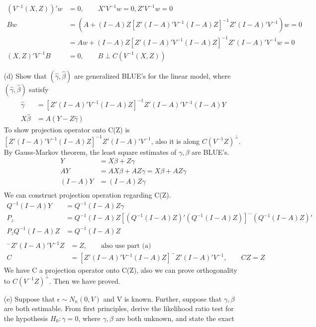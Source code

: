 \begin{itemize}
\begin{align*}
(V^{-1} (X,Z))'w &= 0, \qquad X' V^{-1} w = 0, Z' V^{-1} w = 0\\
Bw &= \left(A + (I-A)Z [Z'(I-A)' V^{-1} (I-A)Z]^{-1} Z'(I-A)'V^{-1} \right) w= 0 \\
&= Aw + (I-A)Z [Z'(I-A)' V^{-1} (I-A)Z]^{-1} Z'(I-A)'V^{-1} w = 0\\
(X,Z)' V^{-1} B &= 0, \qquad B \perp  C(V^{-1} (X,Z))
\end{align*}
\item[(d)] Show that $(\hat{\gamma}, \hat{\beta})$ are generalized BLUE's for the linear model, where $(\hat{\gamma}, \hat{\beta})$ satisfy
\begin{align*}
\hat{\gamma} &= [Z'(I-A)' V^{-1} (I-A)Z]^{-1} Z'(I-A)' V^{-1} (I-A)Y\\
X\hat{\beta} &= A(Y-Z \hat{\gamma})
\end{align*}
To show projection operator onto C(Z) is $[Z'(I-A)' V^{-1} (I-A)Z]^{-1} Z'(I-A)' V^{-1}$, also it is along $C(V^{-1} Z)^{\perp}$.\\
By Gauss-Markov theorem, the least square estimates of $\gamma, \beta$ are BLUE's. 
\begin{align*}
Y &= X\beta + Z\gamma \\
AY &= AX\beta + AZ\gamma = X\beta + AZ\gamma \\
(I-A)Y &= (I-A)Z \gamma\\
\end{align*}
We can construct projection operation regarding C(Z).
\begin{align*}
Q^{-1}(I-A)Y &= Q^{-1}(I-A)Z \gamma\\
P_z &= Q^{-1}(I-A)Z [(Q^{-1}(I-A)Z)' (Q^{-1}(I-A)Z)]^{-} (Q^{-1}(I-A)Z)' \\
P_z Q^{-1}(I-A)Z &= Q^{-1}(I-A)Z \\
\end{align*}
\begin{align*}
[Z'(I-A)'V^{-1}(I-A)Z]^{-}Z'(I-A)'V^{-1} Z&=  Z, \qquad \text{also use part (a)}\\
C &= [Z'(I-A)'V^{-1}(I-A)Z]^{-}Z'(I-A)'V^{-1}, \qquad CZ = Z
\end{align*}
We have C a projection operator onto C(Z), also we can prove orthogonality to $C(V^{-1} Z)^{\perp}$.
Then we have proved.
\item[(e)] Suppose that $\epsilon \sim N_n(0, V )$ and V is known. Further, suppose that
 $\gamma, \beta$ are both estimable. From first principles, derive the likelihood ratio test for
the hypothesis $H_0: \gamma= 0 $, where $\gamma, \beta$ are both unknown, and state the exact

\end{itemize}

